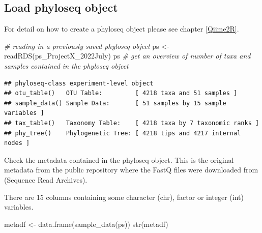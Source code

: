 \documentclass[
]{book}
\newenvironment{Shaded}{\begin{snugshade}}{\end{snugshade}}
\newcommand{\CommentTok}[1]{\textcolor[rgb]{0.56,0.35,0.01}{\textit{#1}}}
\newcommand{\FunctionTok}[1]{\textcolor[rgb]{0.00,0.00,0.00}{#1}}
\newcommand{\NormalTok}[1]{#1}
\newcommand{\OtherTok}[1]{\textcolor[rgb]{0.56,0.35,0.01}{#1}}
\newcommand{\StringTok}[1]{\textcolor[rgb]{0.31,0.60,0.02}{#1}}
\begin{document}
\hfill\break

\hypertarget{load-phyloseq-object}{%
\subsection{Load phyloseq object}\label{load-phyloseq-object}}

For detail on how to create a phyloseq object please see chapter \ref{Qiime2R}.

\begin{Shaded}
\begin{Highlighting}[]
\CommentTok{\# reading in a previously saved phyloseq object}
\NormalTok{ps }\OtherTok{\textless{}{-}} \FunctionTok{readRDS}\NormalTok{(}\StringTok{\textquotesingle{}ps\_ProjectX\_2022July\textquotesingle{}}\NormalTok{)}
\NormalTok{ps  }\CommentTok{\# get an overview of number of taxa and samples contained in the phyloseq object}
\end{Highlighting}
\end{Shaded}

\begin{verbatim}
## phyloseq-class experiment-level object
## otu_table()   OTU Table:         [ 4218 taxa and 51 samples ]
## sample_data() Sample Data:       [ 51 samples by 15 sample variables ]
## tax_table()   Taxonomy Table:    [ 4218 taxa by 7 taxonomic ranks ]
## phy_tree()    Phylogenetic Tree: [ 4218 tips and 4217 internal nodes ]
\end{verbatim}

\hfill\break

Check the metadata contained in the phyloseq object. This is the original metadata from the public repository where the FastQ files were downloaded from (Sequence Read Archives).

There are 15 columns containing some character (chr), factor or integer (int) variables.

\begin{Shaded}
\begin{Highlighting}[]
\NormalTok{metadf }\OtherTok{\textless{}{-}} \FunctionTok{data.frame}\NormalTok{(}\FunctionTok{sample\_data}\NormalTok{(ps))}
\FunctionTok{str}\NormalTok{(metadf)}
\end{Highlighting}
\end{Shaded}
\end{document}
